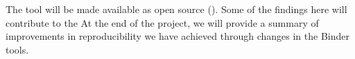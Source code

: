 \begin{task}
  The tool will be made available as open source
  (). Some of the findings
  here will contribute to the  At the end of the project, we will
  provide a summary of improvements in reproducibility we have achieved through
  changes in the Binder tools.
\end{task}
